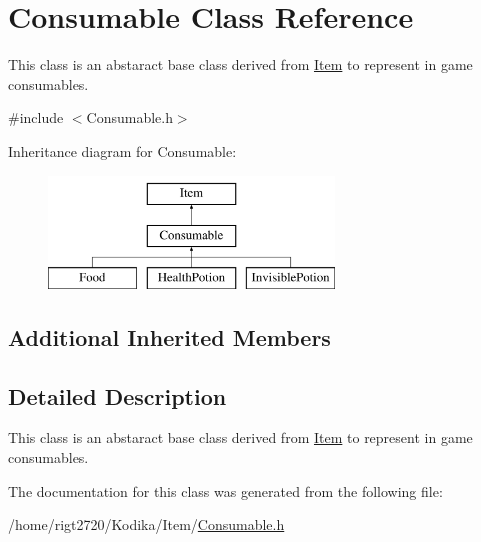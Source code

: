 \hypertarget{classConsumable}{\section{Consumable Class Reference}
\label{classConsumable}
}


This class is an abstaract base class derived from \hyperlink{classItem}{Item} to represent in game consumables.  




{\ttfamily \#include $<$Consumable.\-h$>$}

Inheritance diagram for Consumable\-:\begin{figure}[H]
\begin{center}
\leavevmode
\includegraphics[height=3.000000cm]{classConsumable}
\end{center}
\end{figure}
\subsection*{Additional Inherited Members}


\subsection{Detailed Description}
This class is an abstaract base class derived from \hyperlink{classItem}{Item} to represent in game consumables. 

The documentation for this class was generated from the following file\-:\begin{DoxyCompactItemize}
\item 
/home/rigt2720/\-Kodika/\-Item/\hyperlink{Consumable_8h}{Consumable.\-h}\end{DoxyCompactItemize}
